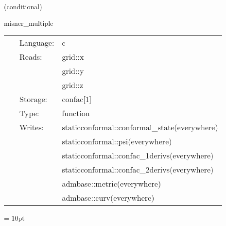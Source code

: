 \vspace{5mm}

   (conditional) 

\hspace{5mm} misner\_multiple 

\hspace{5mm}{\it construct initial data for multiple misner black holes } 


\hspace{5mm}

 \begin{tabular*}{160mm}{cll} 
~ & Language:  & c \\ 
~ & Reads:  & grid::x \\ 
~& ~ &grid::y\\ 
~& ~ &grid::z\\ 
~ & Storage:  & confac[1] \\ 
~ & Type:  & function \\ 
~ & Writes:  & staticconformal::conformal\_state(everywhere) \\ 
~& ~ &staticconformal::psi(everywhere)\\ 
~& ~ &staticconformal::confac\_1derivs(everywhere)\\ 
~& ~ &staticconformal::confac\_2derivs(everywhere)\\ 
~& ~ &admbase::metric(everywhere)\\ 
~& ~ &admbase::curv(everywhere)\\ 
\end{tabular*} 



\vspace{5mm}\parskip = 10pt 
